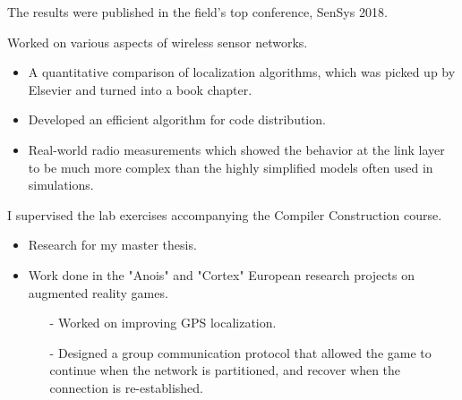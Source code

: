 \documentclass[10pt,a4paper]{../altacv}
\begin{document}
The results were published in the field's top conference, SenSys 2018.

\medskip




\medskip\medskip{}

Worked on various aspects of wireless sensor networks.

\begin{itemize}
	\item\small A quantitative comparison of localization algorithms, which was picked up by Elsevier and turned into a book chapter.
	\item\small Developed an efficient algorithm for code distribution.
	\item\small Real-world radio measurements which showed the behavior at the link layer to be much more complex than the highly simplified models often used in simulations.
\end{itemize}

\medskip

I supervised the lab exercises accompanying the Compiler Construction course.

\medskip




\medskip\medskip{}

\begin{itemize}
\item\small{Research for my master thesis.}
\item\small{Work done in the "Anois" and "Cortex" European research projects on augmented reality games.}
\begin{itemize}
\item[-]\small{Worked on improving GPS localization.}
\item[-]\small{Designed a group communication protocol that allowed the game to continue when the network is partitioned, and recover when the connection is re-established.}
\end{itemize}
\end{itemize}
\end{document}
